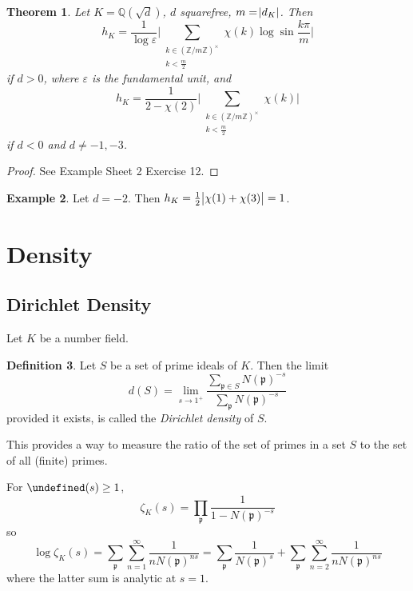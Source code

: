 \documentclass[11pt]{article}
\theoremstyle{definition}
\newtheorem{definition}{Definition}[section]
\newtheorem{example}[definition]{Example}
\theoremstyle{plain}
\newtheorem{theorem}[definition]{Theorem}
\theoremstyle{remark}
\let\Re\undefined
\DeclareMathOperator{\Re}{Re}
\newcommand{\ZZ}{\mathbb{Z}}
\newcommand{\QQ}{\mathbb{Q}}
\newcommand{\fp}{\mathfrak{p}}
\begin{document}
\begin{theorem}\label{thm:7_27}
    Let $K = \QQ(\sqrt{d})$, $d$ squarefree, $m = \abs{d_K}$. Then
    \begin{equation*}
        h_K = \frac{1}{\log \varepsilon} \Bigg\lvert \sum_{\substack{k \in (\ZZ / m\ZZ)^\times \\ k < \frac{m}{2}}} \chi(k) \log \sin \frac{k \pi}{m} \Bigg\rvert
    \end{equation*}
    if $d > 0$, where $\varepsilon$ is the fundamental unit, and
    \begin{equation*}
        h_K = \frac{1}{2 - \chi(2)} \Bigg\lvert \sum_{\substack{k \in (\ZZ/m\ZZ)^\times \\ k < \frac{m}{2}}} \chi(k) \Bigg\rvert
    \end{equation*}
    if $d < 0$ and $d \neq -1, -3$.
\end{theorem}
\begin{proof}
    See Example Sheet 2 Exercise 12.
\end{proof}

\begin{example}\label{eg:7_28}
    Let $d = -2$. Then $h_K = \frac{1}{2} \abs{\chi(1) + \chi(3)} = 1$.
\end{example}

\section{Density}

\subsection{Dirichlet Density}

Let $K$ be a number field.

\begin{definition}\label{def:8_1}
    Let $S$ be a set of prime ideals of $K$. Then the limit
    \begin{equation*}
        d(S) = \lim_{s \to 1^+} \frac{\sum_{\fp \in S} N(\fp)^{-s}}{\sum_{\fp} N(\fp)^{-s}}
    \end{equation*}
    provided it exists, is called the \emph{Dirichlet density} of $S$.
\end{definition}

This provides a way to measure the ratio of the set of primes in a set $S$ to the set of all (finite) primes.

For $\Re(s) \ge 1$,
\begin{equation*}
    \zeta_K(s) = \prod_{\fp} \frac{1}{1 - N(\fp)^{-s}}
\end{equation*}
so
\begin{equation*}
    \log \zeta_K(s) = \sum_{\fp} \sum_{n=1}^\infty \frac{1}{n N(\fp)^{ns}} = \sum_{\fp} \frac{1}{N(\fp)^s} + \sum_{\fp} \sum_{n=2}^\infty \frac{1}{n N(\fp)^{ns}}
\end{equation*}
where the latter sum is analytic at $s=1$.
\end{document}
